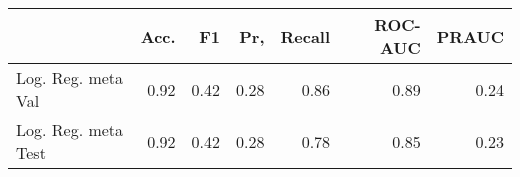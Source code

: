 \begin{tabular}{lrrrrrr}
\toprule
{} &  Acc. &    F1 &   Pr, &  Recall &  ROC-AUC &  PRAUC \\
\midrule
Log. Reg. meta Val  &  0.92 &  0.42 &  0.28 &    0.86 &     0.89 &   0.24 \\
Log. Reg. meta Test &  0.92 &  0.42 &  0.28 &    0.78 &     0.85 &   0.23 \\
\bottomrule
\end{tabular}
